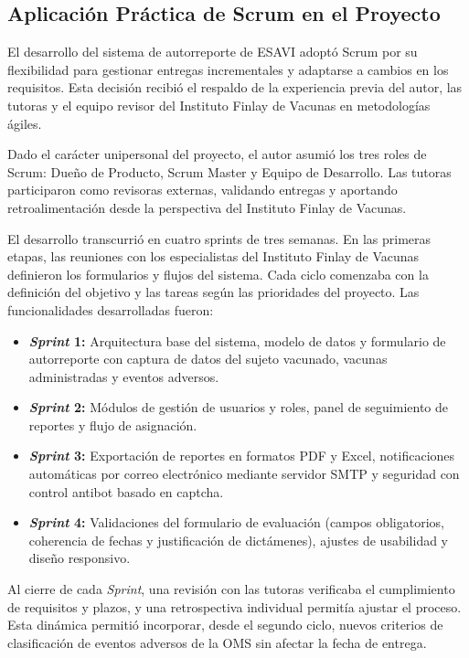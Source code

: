 \subsection{Aplicación Práctica de Scrum en el Proyecto}

El desarrollo del sistema de autorreporte de ESAVI adoptó Scrum por su flexibilidad para gestionar entregas incrementales y adaptarse a cambios en los requisitos.
Esta decisión recibió el respaldo de la experiencia previa del autor, las tutoras y el equipo revisor del Instituto Finlay de Vacunas en metodologías ágiles. 

Dado el carácter unipersonal del proyecto, el autor asumió los tres roles de Scrum: Dueño de Producto, Scrum Master y Equipo de Desarrollo. 
Las tutoras participaron como revisoras externas, validando entregas y aportando retroalimentación desde la perspectiva del Instituto Finlay de Vacunas.

El desarrollo transcurrió en cuatro sprints de tres semanas. 
En las primeras etapas, las reuniones con los especialistas del Instituto Finlay de Vacunas definieron los formularios y flujos del sistema.
Cada ciclo comenzaba con la definición del objetivo y las tareas según las prioridades del proyecto. 
Las funcionalidades desarrolladas fueron:

\begin{itemize}
    \item \textbf{\textit{Sprint} 1:} Arquitectura base del sistema, modelo de datos y formulario de autorreporte con captura de datos del sujeto vacunado, vacunas administradas y eventos adversos.
    \item \textbf{\textit{Sprint} 2:} Módulos de gestión de usuarios y roles, panel de seguimiento de reportes y flujo de asignación.
    \item \textbf{\textit{Sprint} 3:} Exportación de reportes en formatos PDF y Excel, notificaciones automáticas por correo electrónico mediante servidor SMTP y seguridad con control antibot basado en captcha.
    \item \textbf{\textit{Sprint} 4:} Validaciones del formulario de evaluación (campos obligatorios, coherencia de fechas y justificación de dictámenes), ajustes de usabilidad y diseño responsivo.
\end{itemize}

Al cierre de cada \textit{Sprint}, una revisión con las tutoras verificaba el cumplimiento de requisitos y plazos, y una retrospectiva individual permitía ajustar el proceso. 
Esta dinámica permitió incorporar, desde el segundo ciclo, nuevos criterios de clasificación de eventos adversos de la OMS sin afectar la fecha de entrega.

